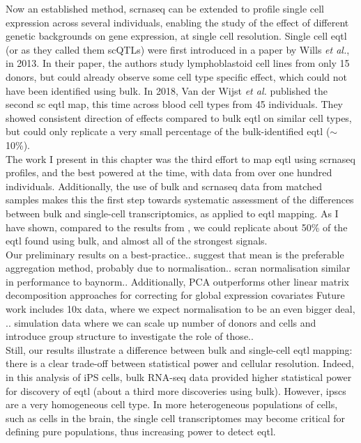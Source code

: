 Now an established method, \gls{scrnaseq} can be extended to profile single cell expression across several individuals, enabling the study of the effect of different genetic backgrounds on gene expression, at single cell resolution.
Single cell \gls{eqtl} (or as they called them scQTLs) were first introduced in a paper by Wills \textit{et al.}, in 2013.
In their paper, the authors study lymphoblastoid cell lines from only 15 donors, but could already observe some cell type specific effect, which could not have been identified using bulk.
In 2018, Van der Wijst \textit{et al.} \cite{van2018single} published the second sc \gls{eqtl} map, this time across blood cell types from 45 individuals.
They showed consistent direction of effects compared to bulk \gls{eqtl} on similar cell types, but could only replicate a very small percentage of the bulk-identified \gls{eqtl} ($\sim$10\%). \\

The work I present in this chapter was the third effort to map \gls{eqtl} using \gls{scrnaseq} profiles, and the best powered at the time, with data from over one hundred individuals.
Additionally, the use of bulk and \gls{scrnaseq} data from matched samples makes this the first step towards systematic assessment of the differences between bulk and single-cell transcriptomics, as applied to \gls{eqtl} mapping.
As I have shown, compared to the results from \cite{van2018single}, we could replicate about 50\% of the \gls{eqtl} found using bulk, and almost all of the strongest signals. \\

Our preliminary results on a best-practice.. suggest that mean is the preferable aggregation method, probably due to normalisation..
scran normalisation similar in performance to baynorm..
Additionally, PCA outperforms other linear matrix decomposition approaches for correcting for global expression covariates
Future work includes 10x data, where we expect normalisation to be an even bigger deal, ..
simulation data where we can scale up number of donors and cells and introduce group structure to investigate the role of those..
\\

Still, our results illustrate a difference between bulk and single-cell \gls{eqtl} mapping: there is a clear trade-off between statistical power and cellular resolution. 
Indeed, in this analysis of iPS cells, bulk RNA-seq data provided higher statistical power for discovery of \gls{eqtl} (about a third more discoveries using bulk). 
However, \glspl{ipsc} are a very homogeneous cell type.
In more heterogeneous populations of cells, such as cells in the brain, the single cell transcriptomes may become critical for defining pure populations, thus increasing power to detect \gls{eqtl}.\\

